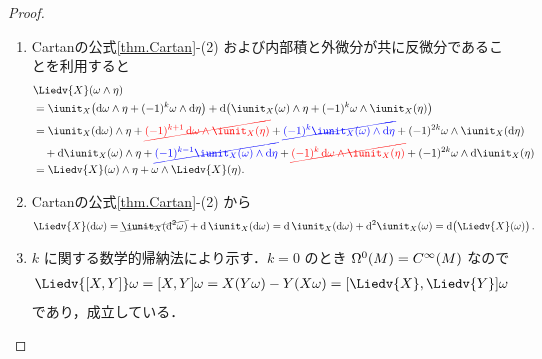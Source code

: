 \documentclass[geometry_main]{subfiles}
\begin{document}
\begin{proof} 
	\begin{enumerate} 
		\item Cartanの公式\ref{thm.Cartan}-(2) および内部積と外微分が共に反微分であることを利用すると
		\begin{align} 
			&\Liedv{X}(\omega \wedge \eta) \\
			&= \iunit_X \bigl( \dd{\omega} \wedge \eta + (-1)^k \omega \wedge \dd{\eta} \bigr) + \dd{\bigl( \iunit_X(\omega) \wedge \eta + (-1)^k \omega \wedge \iunit_X(\eta) \bigr) } \\
			&= \iunit_X(\dd{\omega}) \wedge \eta + \textcolor{red}{\cancel{(-1)^{k+1} \dd{\omega} \wedge \iunit_X(\eta)}} + \textcolor{blue}{\cancel{(-1)^k \iunit_X(\omega) \wedge \dd{\eta}}} + (-1)^{2k} \omega \wedge \iunit_X(\dd{\eta}) \\
			&\quad + \dd{\iunit_X(\omega) \wedge \eta} + \textcolor{blue}{\cancel{(-1)^{k-1} \iunit_X(\omega) \wedge \dd{\eta}}} + \textcolor{red}{\cancel{(-1)^k \dd{\omega} \wedge \iunit_X(\eta)}} + (-1)^{2k} \omega \wedge \dd{\iunit_X(\eta)} \\
			&= \Liedv{X}(\omega) \wedge \eta + \omega \wedge \Liedv{X}(\eta).
		\end{align}
		\item Cartanの公式\ref{thm.Cartan}-(2) から
		\begin{align} 
			\Liedv{X}(\dd{\omega}) = \cancel{\iunit_X (\dd[2]{\omega})} + \dd{} \iunit_X(\dd{\omega}) =  \dd{} \iunit_X(\dd{\omega}) + \dd[2]{\iunit_X(\omega)} = \dd{ \bigl( \Liedv{X}(\omega) \bigr) }.
		\end{align}
		\item $k$ に関する数学的帰納法により示す．$k=0$ のとき $\Omega^0(M) = C^\infty(M)$ なので
		\begin{align} 
			\Liedv{\comm{X}{Y}} \omega = \comm{X}{Y}\omega = X(Y\omega) - Y(X\omega) = \comm{\Liedv{X}}{\Liedv{Y}}\omega
		\end{align}
		であり，成立している．


\end{enumerate}
\end{proof}
\end{document}

